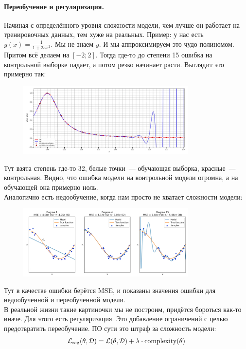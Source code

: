 \documentclass{article}
\begin{document}
    \paragraph{Переобучение и регуляризация.}
    Начиная с определённого уровня сложности модели, чем лучше он работает на тренировочных данных, тем хуже на реальных. Пример: у нас есть $y(x)=\frac1{1+25x^2}$. Мы не знаем $y$. И мы аппроксимируем это чудо полиномом. Притом всё делаем на $[-2;2]$. Тогда где-то до степени 15 ошибка на контрольной выборке падает, а потом резко начинает расти. Выглядит это примерно так:
    \begin{figure}[H]
        \includegraphics[width=0.8\textwidth]{Images/ml_overfitting_example}
    \end{figure}\noindent
    Тут взята степень где-то 32, белые точки~--- обучающая выборка, красные~--- контрольная. Видно, что ошибка модели на контрольной модели огромна, а на обучающей она примерно ноль.\\
    Аналогично есть недообучение, когда нам просто не хватает сложности модели:
    \begin{figure}[H]
        \includegraphics[width=0.8\textwidth]{Images/ml_overfitting_underfitting}
    \end{figure}\noindent
    Тут в качестве ошибки берётся MSE, и показаны значения ошибки для недообученной и переобученной модели.\\
    В реальной жизни такие картиночки мы не построим, придётся бороться как-то иначе. Для этого есть регуляризация. Это добавление ограничений с целью предотвратить переобучение. ПО сути это штраф за сложность модели:
    \[
    {\mathcal{L}}_{\mathrm{reg}}(\theta,{\mathcal{D}})={\mathcal{L}}(\theta,{\mathcal{D}})+\lambda\cdot\operatorname{complexity}(\theta)
    \]
\end{document}
